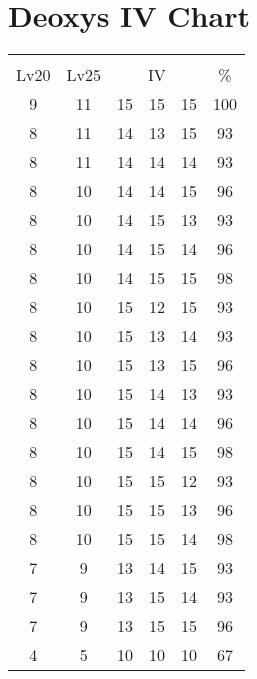 \documentclass{article}%
\begin{document}
%
\normalsize%
\section{Deoxys IV Chart}%
\label{sec:Deoxys IV Chart}%
\renewcommand{\arraystretch}{1.5}%
\begin{tabular}{|c|c|c|c|c|c|}%
\hline%
\multicolumn{6}{|c|}{\textcolor{white}{ 
\linebreak{Deoxys}
}%
\cellcolor{black}}\\%
\multicolumn{1}{|c}{Lv20}&\multicolumn{1}{c|}{Lv25}&\multicolumn{3}{c|}{IV}&\multicolumn{1}{|c|}{\%}\\%
\hline%
\rowcolor{color100}%
9&11&15&15&15&100\\%
\hline%
\rowcolor{color93}%
8&11&14&13&15&93\\%
\hline%
\rowcolor{color93}%
8&11&14&14&14&93\\%
\hline%
\rowcolor{color96}%
8&10&14&14&15&96\\%
\hline%
\rowcolor{color93}%
8&10&14&15&13&93\\%
\hline%
\rowcolor{color96}%
8&10&14&15&14&96\\%
\hline%
\rowcolor{color98}%
8&10&14&15&15&98\\%
\hline%
\rowcolor{color93}%
8&10&15&12&15&93\\%
\hline%
\rowcolor{color93}%
8&10&15&13&14&93\\%
\hline%
\rowcolor{color96}%
8&10&15&13&15&96\\%
\hline%
\rowcolor{color93}%
8&10&15&14&13&93\\%
\hline%
\rowcolor{color96}%
8&10&15&14&14&96\\%
\hline%
\rowcolor{color98}%
8&10&15&14&15&98\\%
\hline%
\rowcolor{color93}%
8&10&15&15&12&93\\%
\hline%
\rowcolor{color96}%
8&10&15&15&13&96\\%
\hline%
\rowcolor{color98}%
8&10&15&15&14&98\\%
\hline%
\rowcolor{color93}%
7&9&13&14&15&93\\%
\hline%
\rowcolor{color93}%
7&9&13&15&14&93\\%
\hline%
\rowcolor{color96}%
7&9&13&15&15&96\\%
\hline%
\rowcolor{color91}%
4&5&10&10&10&67\\%
\end{tabular}

%
\end{document}
